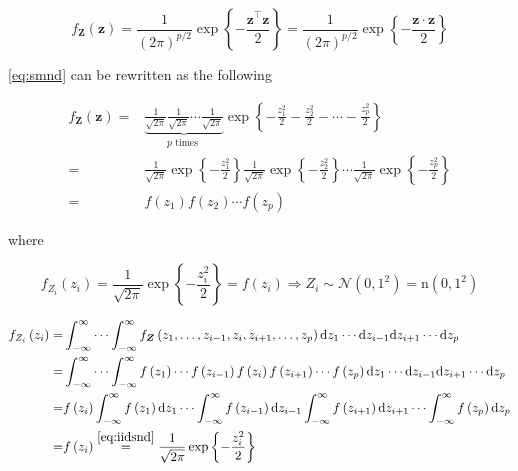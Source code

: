 \documentclass[
]{book}
\theoremstyle{definition}
\theoremstyle{definition}
\theoremstyle{definition}
\theoremstyle{definition}
\theoremstyle{remark}
\begin{document}
\begin{equation}
\label{eq:smnd}
f_{\boldsymbol{Z}}(\boldsymbol{z})=\frac{1}{(2\pi)^{p/2}}\exp\left\{ -\frac{\boldsymbol{z}^{\intercal}\boldsymbol{z}}{2}\right\} =\frac{1}{(2\pi)^{p/2}}\exp\left\{ -\frac{\boldsymbol{z}\cdot\boldsymbol{z}}{2}\right\} 
\end{equation}

\eqref{eq:smnd} can be rewritten as the following

\[
\begin{aligned}
f_{\boldsymbol{Z}}(\boldsymbol{z})= & \underbrace{\frac{1}{\sqrt{2\pi}}\frac{1}{\sqrt{2\pi}}\cdots\frac{1}{\sqrt{2\pi}}}_{p\text{ times }}\exp\left\{ -\frac{z_{1}^{2}}{2}-\frac{z_{2}^{2}}{2}-\cdots-\frac{z_{p}^{2}}{2}\right\} \\
= & \frac{1}{\sqrt{2\pi}}\exp\left\{ -\frac{z_{1}^{2}}{2}\right\} \frac{1}{\sqrt{2\pi}}\exp\left\{ -\frac{z_{2}^{2}}{2}\right\} \cdots\frac{1}{\sqrt{2\pi}}\exp\left\{ -\frac{z_{p}^{2}}{2}\right\} \\
= & f\left(z_{1}\right)f\left(z_{2}\right)\cdots f\left(z_{p}\right)
\end{aligned}
\]

where

\begin{equation}
\label{eq:iidsnd}
f_{Z_{i}}\left(z_{i}\right)=\frac{1}{\sqrt{2\pi}}\exp\left\{ -\frac{z_{i}^{2}}{2}\right\} =f\left(z_{i}\right)\Rightarrow Z_{i}\sim\mathcal{N}\left(0,1^{2}\right)=\mathrm{n}\left(0,1^{2}\right)
\end{equation}

\[
\begin{aligned}
f_{Z_{i}}\left(z_{i}\right)= & \int_{-\infty}^{\infty}\cdots\int_{-\infty}^{\infty}f_{\boldsymbol{Z}}\left(z_{1},\ldots,z_{i-1},z_{i},z_{i+1},\ldots,z_{p}\right)\mathrm{d}z_{1}\cdots\mathrm{d}z_{i-1}\mathrm{d}z_{i+1}\cdots\mathrm{d}z_{p}\\
= & \int_{-\infty}^{\infty}\cdots\int_{-\infty}^{\infty}f\left(z_{1}\right)\cdots f\left(z_{i-1}\right)f\left(z_{i}\right)f\left(z_{i+1}\right)\cdots f\left(z_{p}\right)\mathrm{d}z_{1}\cdots\mathrm{d}z_{i-1}\mathrm{d}z_{i+1}\cdots\mathrm{d}z_{p}\\
= & f\left(z_{i}\right)\int_{-\infty}^{\infty}f\left(z_{1}\right)\mathrm{d}z_{1}\cdots\int_{-\infty}^{\infty}f\left(z_{i-1}\right)\mathrm{d}z_{i-1}\int_{-\infty}^{\infty}f\left(z_{i+1}\right)\mathrm{d}z_{i+1}\cdots\int_{-\infty}^{\infty}f\left(z_{p}\right)\mathrm{d}z_{p}\\
= & f\left(z_{i}\right) \overset{\eqref{eq:iidsnd}}{=}\frac{1}{\sqrt{2\pi}}\exp\left\{ -\frac{z_{i}^{2}}{2}\right\}
\end{aligned}
\]
\end{document}
